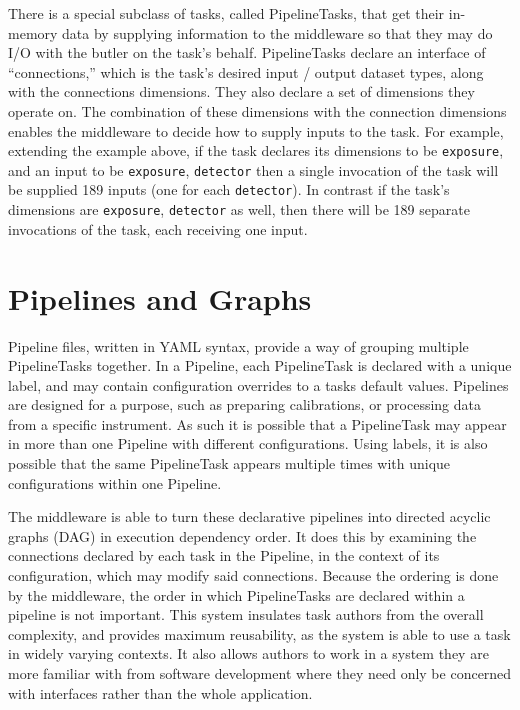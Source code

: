 \documentclass[11pt,twoside]{article}
\begin{document}
There is a special subclass of tasks, called PipelineTasks, that get their in-memory data by supplying information to the middleware so that they may do I/O with the butler on the task's behalf. PipelineTasks declare an interface of ``connections,'' which is the task's desired input / output dataset types, along with the connections dimensions. They also declare a set of dimensions they operate on. The combination of these dimensions with the connection dimensions enables the middleware to decide how to supply inputs to the task. For example, extending the example above, if the task declares its dimensions to be \texttt{exposure}, and an input to be \texttt{exposure}, \texttt{detector} then a single invocation of the task will be supplied 189 inputs (one for each \texttt{detector}). In contrast if the task's dimensions are \texttt{exposure}, \texttt{detector} as well, then there will be 189 separate invocations of the task, each receiving one input.

\section{Pipelines and Graphs}
Pipeline files, written in YAML syntax, provide a way of grouping multiple PipelineTasks together. In a Pipeline, each PipelineTask is declared with a unique label, and may contain configuration overrides to a tasks default values. Pipelines are designed for a purpose, such as preparing calibrations, or processing data from a specific instrument. As such it is possible that a PipelineTask may appear in more than one Pipeline with different configurations. Using labels, it is also possible that the same PipelineTask appears multiple times with unique configurations within one Pipeline.

The middleware is able to turn these declarative pipelines into directed acyclic graphs (DAG) in execution dependency order. It does this by examining the connections declared by each task in the Pipeline, in the context of its configuration, which may modify said connections. Because the ordering is done by the middleware, the order in which PipelineTasks are declared within a pipeline is not important. This system insulates task authors from the overall complexity, and provides maximum reusability, as the system is able to use a task in widely varying contexts. It also allows authors to work in a system they are more familiar with from software development where they need only be concerned with interfaces rather than the whole application.
\end{document}
